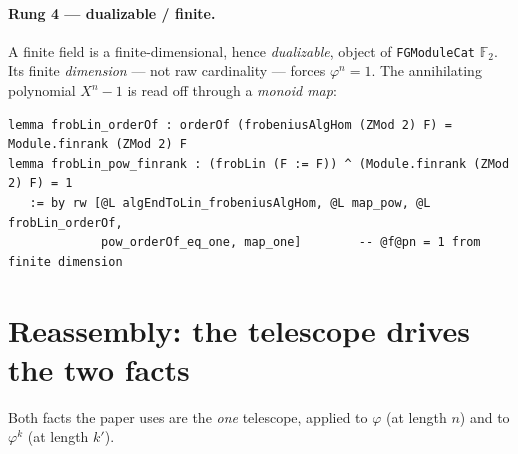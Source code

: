 \documentclass[11pt]{article}
\newcommand{\lc}[1]{\texttt{\small #1}}
\newcommand{\Ff}{\mathbb{F}_2}
\newcommand{\End}{\operatorname{End}}
\newcommand{\Module}{\operatorname{Module}}
\begin{document}
\paragraph{Rung 4 --- dualizable / finite.} A finite field is a
finite-dimensional, hence \emph{dualizable}, object of \lc{FGModuleCat} $\Ff$.
Its finite \emph{dimension} --- not raw cardinality --- forces $\varphi^{n}=1$.
The annihilating polynomial $X^{n}-1$ is read off through a \emph{monoid map}:
\begin{center}
\end{center}
\begin{lstlisting}
lemma frobLin_orderOf : orderOf (frobeniusAlgHom (ZMod 2) F) = Module.finrank (ZMod 2) F
lemma frobLin_pow_finrank : (frobLin (F := F)) ^ (Module.finrank (ZMod 2) F) = 1
   := by rw [@L algEndToLin_frobeniusAlgHom, @L map_pow, @L frobLin_orderOf,
             pow_orderOf_eq_one, map_one]        -- @f@pn = 1 from finite dimension
\end{lstlisting}

\section{Reassembly: the telescope drives the two facts}

Both facts the paper uses are the \emph{one} telescope, applied to $\varphi$ (at
length $n$) and to $\varphi^{k}$ (at length $k'$).
\end{document}
